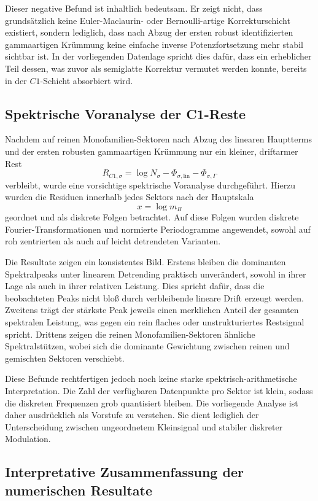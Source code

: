 \documentclass[11pt,a4paper]{article}
\theoremstyle{definition}
\theoremstyle{remark}
\begin{document}
Dieser negative Befund ist inhaltlich bedeutsam. Er zeigt nicht, dass grundsätzlich keine Euler-Maclaurin- oder Bernoulli-artige Korrekturschicht existiert, sondern lediglich, dass nach Abzug der ersten robust identifizierten gammaartigen Krümmung keine einfache inverse Potenzfortsetzung mehr stabil sichtbar ist. In der vorliegenden Datenlage spricht dies dafür, dass ein erheblicher Teil dessen, was zuvor als semiglatte Korrektur vermutet werden konnte, bereits in der \(C1\)-Schicht absorbiert wird.

\subsection{Spektrische Voranalyse der C1-Reste}

Nachdem auf reinen Monofamilien-Sektoren nach Abzug des linearen Hauptterms und der ersten robusten gammaartigen Krümmung nur ein kleiner, driftarmer Rest
\[
R_{C1,\sigma}
=
\log N_\sigma-\Phi_{\sigma,\mathrm{lin}}-\Phi_{\sigma,\Gamma}
\]
verbleibt, wurde eine vorsichtige spektrische Voranalyse durchgeführt. Hierzu wurden die Residuen innerhalb jedes Sektors nach der Hauptskala
\[
x=\log m_B
\]
geordnet und als diskrete Folgen betrachtet. Auf diese Folgen wurden diskrete Fourier-Transformationen und normierte Periodogramme angewendet, sowohl auf roh zentrierten als auch auf leicht detrendeten Varianten.

Die Resultate zeigen ein konsistentes Bild. Erstens bleiben die dominanten Spektralpeaks unter linearem Detrending praktisch unverändert, sowohl in ihrer Lage als auch in ihrer relativen Leistung. Dies spricht dafür, dass die beobachteten Peaks nicht bloß durch verbleibende lineare Drift erzeugt werden. Zweitens trägt der stärkste Peak jeweils einen merklichen Anteil der gesamten spektralen Leistung, was gegen ein rein flaches oder unstrukturiertes Restsignal spricht. Drittens zeigen die reinen Monofamilien-Sektoren ähnliche Spektralstützen, wobei sich die dominante Gewichtung zwischen reinen und gemischten Sektoren verschiebt.

Diese Befunde rechtfertigen jedoch noch keine starke spektrisch-arithmetische Interpretation. Die Zahl der verfügbaren Datenpunkte pro Sektor ist klein, sodass die diskreten Frequenzen grob quantisiert bleiben. Die vorliegende Analyse ist daher ausdrücklich als Vorstufe zu verstehen. Sie dient lediglich der Unterscheidung zwischen ungeordnetem Kleinsignal und stabiler diskreter Modulation.

\subsection{Interpretative Zusammenfassung der numerischen Resultate}
\end{document}
